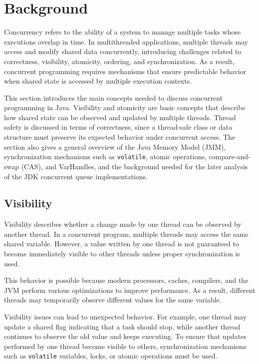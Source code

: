 \section{Background}
Concurrency refers to the ability of a system to manage multiple tasks whose executions overlap in time. In multithreaded applications, multiple threads may access and modify shared data concurrently, introducing challenges related to correctness, visibility, atomicity, ordering, and synchronization. As a result, concurrent programming requires mechanisms that ensure predictable behavior when shared state is accessed by multiple execution contexts.

This section introduces the main concepts needed to discuss concurrent programming in Java. Visibility and atomicity are basic concepts that describe how shared state can be observed and updated by multiple threads. Thread safety is discussed in terms of correctness, since a thread-safe class or data structure must preserve its expected behavior under concurrent access. The section also gives a general overview of the Java Memory Model (JMM), synchronization mechanisms such as \texttt{volatile}, atomic operations, compare-and-swap (CAS), and VarHandles, and the background needed for the later analysis of the JDK concurrent queue implementations.

\subsection{Visibility}

Visibility describes whether a change made by one thread can be observed by another thread. In a concurrent program, multiple threads may access the same shared variable. However, a value written by one thread is not guaranteed to become immediately visible to other threads unless proper synchronization is used. \cite{java-concurrency}

This behavior is possible because modern processors, caches, compilers, and the JVM perform various optimizations to improve performance. As a result, different threads may temporarily observe different values for the same variable. \cite{java-concurrency}

Visibility issues can lead to unexpected behavior. For example, one thread may update a shared flag indicating that a task should stop, while another thread continues to observe the old value and keeps executing. To ensure that updates performed by one thread become visible to others, synchronization mechanisms such as \texttt{volatile} variables, locks, or atomic operations must be used. \cite{java-concurrency}


